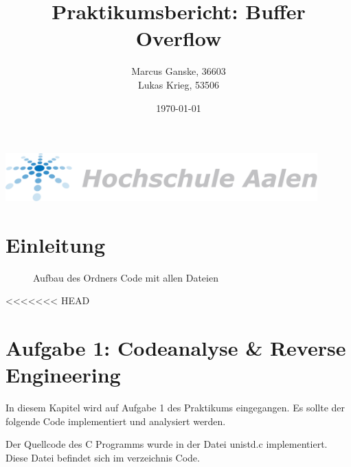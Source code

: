 \documentclass[12pt]{article}
\title{Praktikumsbericht: Buffer Overflow}
\author{Marcus Ganske, 36603\\
		Lukas Krieg, 53506}
\date{\today}
\begin{document}
\maketitle
\vspace{+8cm}{
}
\includegraphics[width=12cm]{Hochschule-aalen.pdf}

\newpage
\renewcommand\contentsname{Inhaltsverzeichnis}
\tableofcontents
\newpage
	
	\section{Einleitung}
	\begin{figure}[H]
	
		\caption{Aufbau des Ordners Code mit allen Dateien}
	\end{figure}	


\newpage
<<<<<<< HEAD
	\section{Aufgabe 1: Codeanalyse \& Reverse Engineering}
		In diesem Kapitel wird auf Aufgabe 1 des Praktikums eingegangen.
		Es sollte der folgende Code implementiert und analysiert werden.
		

		Der Quellcode des C Programms wurde in der Datei unistd.c implementiert.
		Diese Datei befindet sich im verzeichnis Code.
\end{document}
